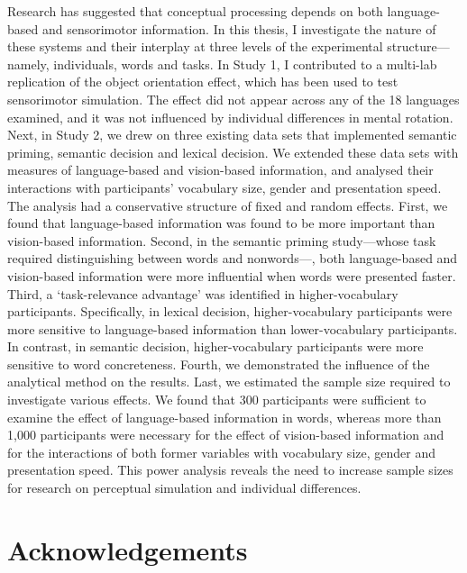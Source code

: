 \documentclass[
  12pt,
  man,floatsintext]{apa7}
\begin{document}
Research has suggested that conceptual processing depends on both language-based and sensorimotor information. In this thesis, I investigate the nature of these systems and their interplay at three levels of the experimental structure---namely, individuals, words and tasks. In Study 1, I contributed to a multi-lab replication of the object orientation effect, which has been used to test sensorimotor simulation. The effect did not appear across any of the 18 languages examined, and it was not influenced by individual differences in mental rotation. Next, in Study 2, we drew on three existing data sets that implemented semantic priming, semantic decision and lexical decision. We extended these data sets with measures of language-based and vision-based information, and analysed their interactions with participants' vocabulary size, gender and presentation speed. The analysis had a conservative structure of fixed and random effects. First, we found that language-based information was found to be more important than vision-based information. Second, in the semantic priming study---whose task required distinguishing between words and nonwords---, both language-based and vision-based information were more influential when words were presented faster. Third, a `task-relevance advantage' was identified in higher-vocabulary participants. Specifically, in lexical decision, higher-vocabulary participants were more sensitive to language-based information than lower-vocabulary participants. In contrast, in semantic decision, higher-vocabulary participants were more sensitive to word concreteness. Fourth, we demonstrated the influence of the analytical method on the results. Last, we estimated the sample size required to investigate various effects. We found that 300 participants were sufficient to examine the effect of language-based information in words, whereas more than 1,000 participants were necessary for the effect of vision-based information and for the interactions of both former variables with vocabulary size, gender and presentation speed. This power analysis reveals the need to increase sample sizes for research on perceptual simulation and individual differences.

\newpage

\begin{flushleft}
{
\tableofcontents
}
\end{flushleft}

\newpage

\hypertarget{acknowledgements}{%
\section{Acknowledgements}\label{acknowledgements}}
\end{document}

